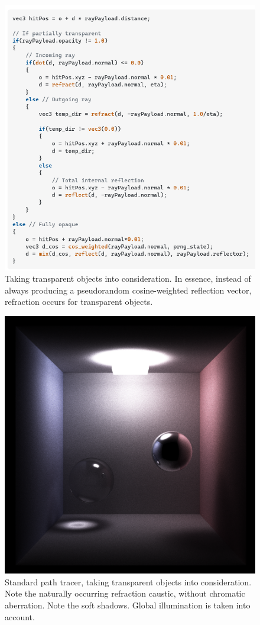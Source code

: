 \documentclass[12pt]{article}
\begin{document}
\begin{figure} 
\centering
  \includegraphics[width = 6 in]{code.png}
  \caption{ Taking transparent objects into consideration.
In essence, instead of always producing a pseudorandom cosine-weighted reflection vector, refraction occurs for transparent objects.
}
\end{figure}

\begin{figure} 
\centering
  \includegraphics[width = 6 in]{v_rt_reflect_no_chromatic_aberration_low_res.png}
  \caption{  Standard path tracer, taking transparent objects into consideration. 
Note the naturally occurring refraction caustic, without chromatic aberration.
Note the soft shadows.
Global illumination is taken into account.
}
\end{figure}
\end{document}
